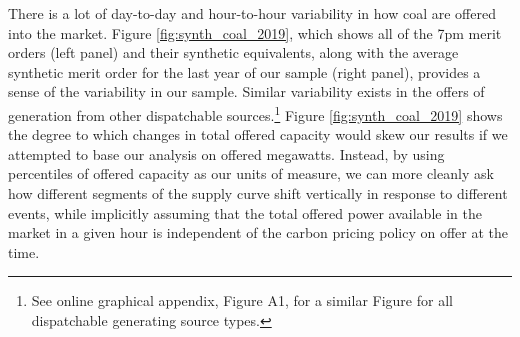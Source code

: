 \documentclass[12pt]{article}
\begin{document}
There is a lot of day-to-day and hour-to-hour variability in how coal are offered into the market. Figure \ref{fig:synth_coal_2019}, which shows all of the 7pm merit orders (left panel) and their synthetic equivalents, along with the average synthetic merit order for the last year of our sample (right panel), provides a sense of the variability in our sample. Similar variability exists in the offers of generation from other dispatchable sources.\footnote{See online graphical appendix, Figure A1, for a similar Figure for all dispatchable generating source types.} Figure \ref{fig:synth_coal_2019} shows the degree to which changes in total offered capacity would skew our results if we attempted to base our analysis on offered megawatts. Instead, by using percentiles of offered capacity as our units of measure, we can more cleanly ask how different segments of the supply curve shift vertically in response to different events, while implicitly assuming that the total offered power available in the market in a given hour is independent of the carbon pricing policy on offer at the time.
\end{document}
